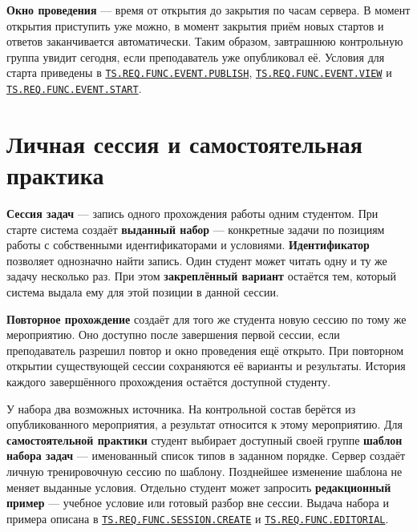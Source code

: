 \documentclass[12pt,a4paper]{article}
\begin{document}
\textbf{Окно проведения} --- время от открытия до закрытия по часам сервера. В момент открытия приступить уже можно, в момент закрытия приём новых стартов и ответов заканчивается автоматически. Таким образом, завтрашнюю контрольную группа увидит сегодня, если преподаватель уже опубликовал её. Условия для старта приведены в {\href{../02\_Техническое\_задание/DOC-02\_Техническое\_задание.pdf\#ts-req-func-event-publish}{\texttt{TS.\allowbreak{}REQ.\allowbreak{}FUNC.\allowbreak{}EVENT.\allowbreak{}PUBLISH}}}, {\href{../02\_Техническое\_задание/DOC-02\_Техническое\_задание.pdf\#ts-req-func-event-view}{\texttt{TS.\allowbreak{}REQ.\allowbreak{}FUNC.\allowbreak{}EVENT.\allowbreak{}VIEW}}} и {\href{../02\_Техническое\_задание/DOC-02\_Техническое\_задание.pdf\#ts-req-func-event-start}{\texttt{TS.\allowbreak{}REQ.\allowbreak{}FUNC.\allowbreak{}EVENT.\allowbreak{}START}}}.

\section{Личная сессия и самостоятельная практика}\label{ux43bux438ux447ux43dux430ux44f-ux441ux435ux441ux441ux438ux44f-ux438-ux441ux430ux43cux43eux441ux442ux43eux44fux442ux435ux43bux44cux43dux430ux44f-ux43fux440ux430ux43aux442ux438ux43aux430}

\hypertarget{личная-сессия-и-самостоятельная-практика}{}

\textbf{Сессия задач} --- запись одного прохождения работы одним студентом. При старте система создаёт \textbf{выданный набор} --- конкретные задачи по позициям работы с собственными идентификаторами и условиями. \textbf{Идентификатор} позволяет однозначно найти запись. Один студент может читать одну и ту же задачу несколько раз. При этом \textbf{закреплённый вариант} остаётся тем, который система выдала ему для этой позиции в данной сессии.

\textbf{Повторное прохождение} создаёт для того же студента новую сессию по тому же мероприятию. Оно доступно после завершения первой сессии, если преподаватель разрешил повтор и окно проведения ещё открыто. При повторном открытии существующей сессии сохраняются её варианты и результаты. История каждого завершённого прохождения остаётся доступной студенту.

У набора два возможных источника. На контрольной состав берётся из опубликованного мероприятия, а результат относится к этому мероприятию. Для \textbf{самостоятельной практики} студент выбирает доступный своей группе \textbf{шаблон набора задач} --- именованный список типов в заданном порядке. Сервер создаёт личную тренировочную сессию по шаблону. Позднейшее изменение шаблона не меняет выданные условия. Отдельно студент может запросить \textbf{редакционный пример} --- учебное условие или готовый разбор вне сессии. Выдача набора и примера описана в {\href{../02\_Техническое\_задание/DOC-02\_Техническое\_задание.pdf\#ts-req-func-session-create}{\texttt{TS.\allowbreak{}REQ.\allowbreak{}FUNC.\allowbreak{}SESSION.\allowbreak{}CREATE}}} и {\href{../02\_Техническое\_задание/DOC-02\_Техническое\_задание.pdf\#ts-req-func-editorial}{\texttt{TS.\allowbreak{}REQ.\allowbreak{}FUNC.\allowbreak{}EDITORIAL}}}.
\end{document}
